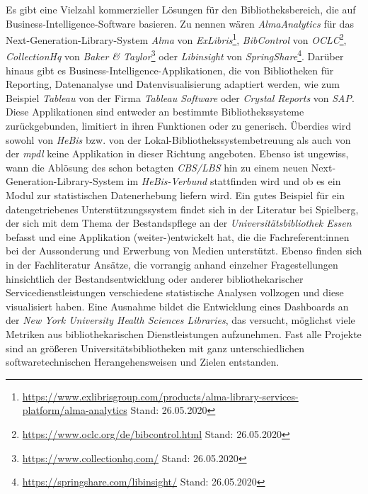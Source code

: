Es gibt eine Vielzahl kommerzieller Lösungen für den Bibliotheksbereich, die auf Business-Intelligence-Software basieren.
Zu nennen wären \textit{AlmaAnalytics} für das
Next-Generation-Library-System \textit{Alma} von \textit{ExLibris}\footnote{\url{https://www.exlibrisgroup.com/products/alma-library-services-platform/alma-analytics}
Stand: 26.05.2020}, \textit{BibControl} von \textit{OCLC}\footnote{\url{https://www.oclc.org/de/bibcontrol.html} Stand: 26.05.2020},
\textit{CollectionHq} von \textit{Baker \& Taylor}\footnote{\url{https://www.collectionhq.com/} Stand: 26.05.2020} oder \textit{Libinsight} von \textit{SpringShare}\footnote{\url{https://springshare.com/libinsight/} Stand: 26.05.2020}.
Darüber hinaus gibt es Business-Intelligence-Applikationen, die von
Bibliotheken für Reporting, Datenanalyse und Datenvisualisierung adaptiert werden,
wie zum Beispiel \textit{Tableau} von der Firma \textit{Tableau Software} oder
\textit{Crystal Reports} von \textit{SAP}.
Diese Applikationen sind entweder
an bestimmte Bibliothekssysteme zurückgebunden, limitiert in ihren
Funktionen\cite{golas_statistische_2018} oder zu generisch.
Überdies wird sowohl von \textit{HeBis} bzw. von der
Lokal-Bibliothekssystembetreuung als auch von der \textit{mpdl} keine Applikation
in dieser Richtung angeboten.
Ebenso ist ungewiss, wann die Ablösung des schon betagten \textit{CBS/LBS} hin zu
einem neuen Next-Generation-Library-System im \textit{HeBis-Verbund} stattfinden wird und ob
es ein Modul zur statistischen Datenerhebung liefern wird.
Ein gutes Beispiel für ein datengetriebenes Unterstützungssystem findet sich in
der Literatur bei Spielberg, der sich mit dem Thema der Bestandspflege an der
\textit{Universitätsbibliothek Essen} befasst und eine Applikation (weiter-)entwickelt hat, die
die Fachreferent:innen bei der Aussonderung und Erwerbung von Medien
unterstützt.\cite{spielberg_eike_t_fachref-assistent_nodate}
Ebenso finden sich in der Fachliteratur Ansätze, die vorrangig anhand einzelner
Fragestellungen hinsichtlich der Bestandsentwicklung\cite{hughes_long-term_2016} oder anderer
bibliothekarischer Servicedienstleistungen\cite{kutlay_shiny_2020, knievel_use_2006,meyer_using_2018} verschiedene statistische Analysen
vollzogen und diese visualisiert haben.
Eine Ausnahme bildet die Entwicklung eines Dashboards an der \textit{New York
University Health Sciences Libraries}, das versucht, möglichst viele Metriken
aus bibliothekarischen Dienstleistungen aufzunehmen.\cite{morton-owens_trends_2012}
Fast alle Projekte sind an größeren
Universitätsbibliotheken mit ganz unterschiedlichen softwaretechnischen
Herangehensweisen\cite{finch_using_2016, wiegand_visualizing_2013} und Zielen\cite{phetteplace_effectively_nodate} entstanden.

